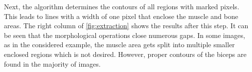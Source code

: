 Next, the algorithm determines the contours of all regions with marked pixels. This leads to lines with a width of one pixel that enclose the muscle and bone areas. The right column of \cref{fig:extraction} shows the results after this step. It can be seen that the morphological operations close numerous gaps. In some images, as in the considered example, the muscle area gets split into multiple smaller enclosed regions which is not desired. However, proper contours of the biceps are found in the majority of images. 

\fboxsep=0mm   %
\fboxrule=1pt   %
\begin{figure}%
  \centering%
  \quad%
  \vspace*{5mm}\\
  \quad%

\end{figure}
